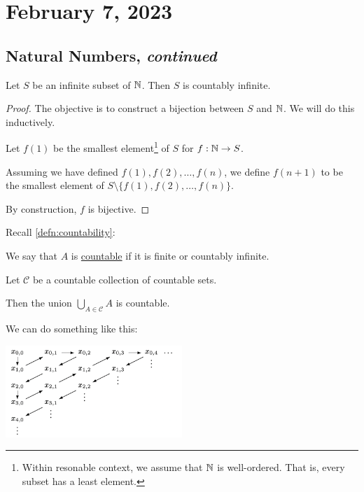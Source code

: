 \section{February 7, 2023}
\subsection{Natural Numbers, \emph{continued}}
\begin{theorem}
    Let $S$ be an infinite subset of $\mathbb N$. Then $S$ is countably infinite.
\end{theorem}
\begin{proof}
    The objective is to construct a bijection between $S$ and $\mathbb N$. We will do this inductively.

    Let $f(1)$ be the smallest element\footnote{Within resonable context, we assume that $\mathbb N$ is well-ordered. That is, every subset has a least element.} of $S$ for $f : \mathbb N\to S$.

    Assuming we have defined $f(1), f(2), \dots, f(n)$, we define $f(n+1)$ to be the smallest element of $S \setminus \{f(1), f(2), \dots, f(n)\}$.

    By construction, $f$ is bijective.
\end{proof}

Recall \cref{defn:countability}:
\begin{definition*}[Countability]
    We say that $A$ is \ul{countable} if it is finite or countably infinite.
\end{definition*}

\begin{theorem}
    Let $\mathcal{C}$ be a countable collection of countable sets.

    Then the union $\displaystyle \bigcup_{A\in \mathcal{C}}A$ is countable.
\end{theorem}

We can do something like this:
\begin{center}
    \includegraphics[width=0.5\textwidth]{images/countable_collection_of_sets.png}
\end{center}

